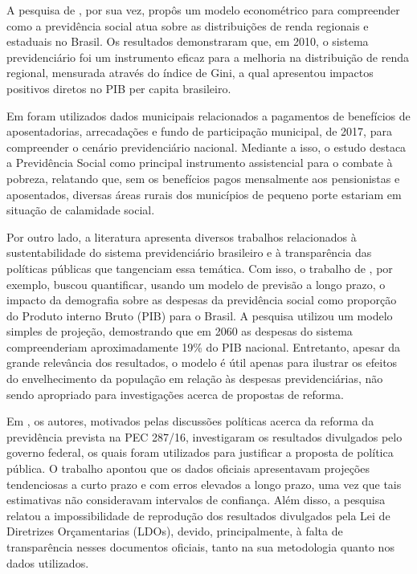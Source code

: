 A pesquisa de \cite{cap03_ref4}, por sua vez, propôs um modelo econométrico para compreender como a previdência social atua sobre as distribuições de renda regionais e estaduais no Brasil. Os resultados demonstraram que, em 2010, o sistema previdenciário foi um instrumento eficaz para a melhoria na distribuição de renda regional, mensurada através do índice de Gini, a qual apresentou impactos positivos diretos no PIB per capita brasileiro. 

Em \cite{cap04_ref12} foram utilizados dados municipais relacionados a pagamentos de benefícios de aposentadorias, arrecadações e fundo de participação municipal, de 2017, para compreender o cenário previdenciário nacional. Mediante a isso, o estudo destaca a Previdência Social como principal instrumento assistencial para o combate à pobreza, relatando que, sem os benefícios pagos mensalmente aos pensionistas e aposentados, diversas áreas rurais dos municípios de pequeno porte estariam em situação de calamidade social.

Por outro lado, a literatura apresenta diversos trabalhos relacionados à sustentabilidade do sistema previdenciário brasileiro e à transparência das políticas públicas que tangenciam essa temática. Com isso, o trabalho de  \cite{cap03_ref5}, por exemplo, buscou quantificar, usando um modelo de previsão a longo prazo, o impacto da demografia sobre as despesas da previdência social como proporção do Produto interno Bruto (PIB) para o Brasil. A pesquisa utilizou um modelo simples de projeção, demostrando que em 2060 as despesas do sistema compreenderiam aproximadamente 19\% do PIB nacional. Entretanto, apesar da grande relevância dos resultados, o modelo é útil apenas para ilustrar os efeitos do envelhecimento da população em relação às despesas previdenciárias, não sendo apropriado para investigações acerca de propostas de reforma. 

Em \cite{cap05_ref9}, os autores, motivados pelas discussões políticas acerca da reforma da previdência prevista na PEC 287/16, investigaram os resultados divulgados pelo governo federal, os quais foram utilizados para justificar a proposta de política pública. O trabalho apontou que os dados oficiais apresentavam projeções tendenciosas a curto prazo e com erros elevados a longo prazo, uma vez que tais estimativas não consideravam intervalos de confiança. Além disso, a pesquisa relatou a impossibilidade de reprodução dos resultados divulgados pela Lei de Diretrizes Orçamentarias (LDOs), devido, principalmente, à falta de transparência nesses documentos oficiais, tanto na sua metodologia quanto nos dados utilizados.

